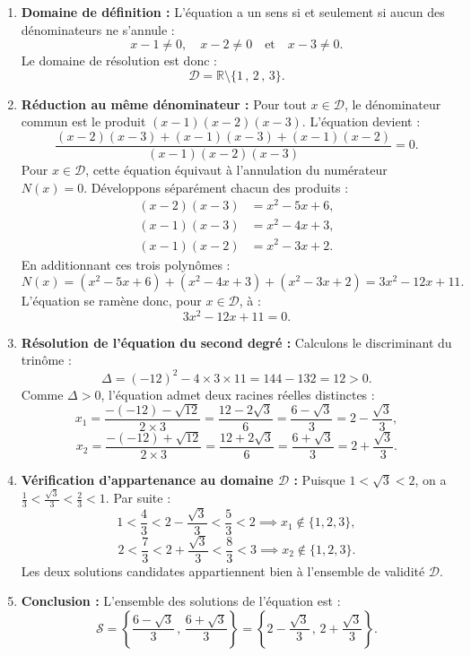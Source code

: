 \documentclass[11pt,a4paper]{article}
\newcommand{\R}{\mathbb{R}}
\begin{document}
\begin{correctionbox}
\begin{enumerate}
    \item \textbf{Domaine de définition :}
    L'équation a un sens si et seulement si aucun des dénominateurs ne s'annule :
    \[
    x - 1 \neq 0, \quad x - 2 \neq 0 \quad \text{et} \quad x - 3 \neq 0.
    \]
    Le domaine de résolution est donc :
    \[
    \mathcal{D} = \R \setminus \{1\,,\, 2\,,\, 3\}.
    \]

    \item \textbf{Réduction au même dénominateur :}
    Pour tout $x \in \mathcal{D}$, le dénominateur commun est le produit $(x-1)(x-2)(x-3)$.
    L'équation devient :
    \[
    \frac{(x-2)(x-3) + (x-1)(x-3) + (x-1)(x-2)}{(x-1)(x-2)(x-3)} = 0.
    \]
    Pour $x \in \mathcal{D}$, cette équation équivaut à l'annulation du numérateur $N(x) = 0$.
    Développons séparément chacun des produits :
    \begin{align*}
    (x-2)(x-3) &= x^2 - 5x + 6, \\
    (x-1)(x-3) &= x^2 - 4x + 3, \\
    (x-1)(x-2) &= x^2 - 3x + 2.
    \end{align*}
    En additionnant ces trois polynômes :
    \[
    N(x) = (x^2 - 5x + 6) + (x^2 - 4x + 3) + (x^2 - 3x + 2) = 3x^2 - 12x + 11.
    \]
    L'équation se ramène donc, pour $x \in \mathcal{D}$, à :
    \[
    3x^2 - 12x + 11 = 0.
    \]

    \item \textbf{Résolution de l'équation du second degré :}
    Calculons le discriminant du trinôme :
    \[
    \Delta = (-12)^2 - 4 \times 3 \times 11 = 144 - 132 = 12 > 0.
    \]
    Comme $\Delta > 0$, l'équation admet deux racines réelles distinctes :
    \[
    x_1 = \frac{-(-12) - \sqrt{12}}{2 \times 3} = \frac{12 - 2\sqrt{3}}{6} = \frac{6 - \sqrt{3}}{3} = 2 - \frac{\sqrt{3}}{3},
    \]
    \[
    x_2 = \frac{-(-12) + \sqrt{12}}{2 \times 3} = \frac{12 + 2\sqrt{3}}{6} = \frac{6 + \sqrt{3}}{3} = 2 + \frac{\sqrt{3}}{3}.
    \]

    \item \textbf{Vérification d'appartenance au domaine $\mathcal{D}$ :}
    Puisque $1 < \sqrt{3} < 2$, on a $\frac{1}{3} < \frac{\sqrt{3}}{3} < \frac{2}{3} < 1$.
    Par suite :
    \[
    1 < \frac{4}{3} < 2 - \frac{\sqrt{3}}{3} < \frac{5}{3} < 2 \implies x_1 \notin \{1, 2, 3\},
    \]
    \[
    2 < \frac{7}{3} < 2 + \frac{\sqrt{3}}{3} < \frac{8}{3} < 3 \implies x_2 \notin \{1, 2, 3\}.
    \]
    Les deux solutions candidates appartiennent bien à l'ensemble de validité $\mathcal{D}$.

    \item \textbf{Conclusion :}
    L'ensemble des solutions de l'équation est :
    \[
    \mathcal{S} = \left\{ \frac{6 - \sqrt{3}}{3}\,,\, \frac{6 + \sqrt{3}}{3} \right\} = \left\{ 2 - \frac{\sqrt{3}}{3}\,,\, 2 + \frac{\sqrt{3}}{3} \right\}.
    \]
\end{enumerate}
\end{correctionbox}
\end{document}
